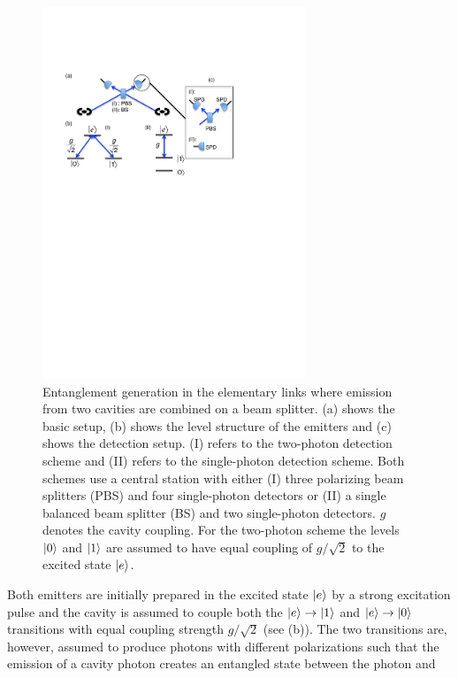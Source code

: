 \begin{figure} 
\centering
\includegraphics[width=0.7\textwidth]{./figs_Borregaard_PRA2015/figure2}
\caption[Entanglement generation I]{Entanglement generation in the elementary
links where emission from two cavities are combined on a beam splitter. (a)
shows the basic setup, (b) shows the level structure of the emitters and (c)
shows the detection setup.  (I) refers to the two-photon detection scheme and
(II) refers to the single-photon detection scheme. Both schemes use a central
station with either (I) three polarizing beam splitters (PBS) and four
single-photon detectors or (II) a single balanced beam splitter (BS) and two
single-photon detectors.  $g$ denotes the cavity coupling. For the two-photon
scheme the levels $| 0 \rangle$ and $| 1 \rangle$ are assumed to have equal coupling of
$g/\sqrt{2}$ to the excited state $| e \rangle$.}
\label{fig:figure2}
\end{figure} 
Both emitters are initially prepared in the excited state $| e \rangle$ by a strong
excitation pulse and the cavity is assumed to couple both the
$| e \rangle\to| 1 \rangle$ and $| e \rangle\to| 0 \rangle$ transitions with equal coupling
strength $g/\sqrt{2}$ (see (b)). The two transitions are,
however, assumed to produce photons with different polarizations such that the
emission of a cavity photon creates an entangled state between the photon and
